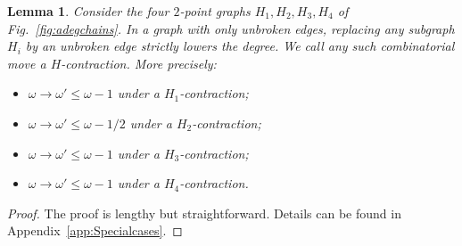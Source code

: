\documentclass[10pt]{article}
\theoremstyle{plain}
\newtheorem{lemma}{Lemma}
\theoremstyle{definition}
\begin{document}
\begin{lemma}\label{lem:2pointmoves}
Consider the four $2$-point graphs $H_1,H_2,H_3,H_4$ of Fig.~\ref{fig:adegchains}. In a graph with only unbroken edges, replacing any subgraph $H_i$ by an unbroken edge strictly 
lowers the degree. We call any such combinatorial move a \emph{$H$-contraction}. More precisely:
\begin{itemize}
\item $\omega \to \omega' \leq \omega -1$ under a $H_1$-contraction;
\item $\omega \to \omega' \leq \omega - 1/2$ under a $H_2$-contraction;
\item $\omega \to \omega' \leq \omega - 1$ under a $H_3$-contraction;
\item $\omega \to \omega' \leq \omega - 1$ under a $H_4$-contraction.
\end{itemize}
\end{lemma}
\begin{proof}
The proof is lengthy but straightforward. Details can be found in Appendix~\ref{app:Specialcases}.

\end{proof}
\end{document}
